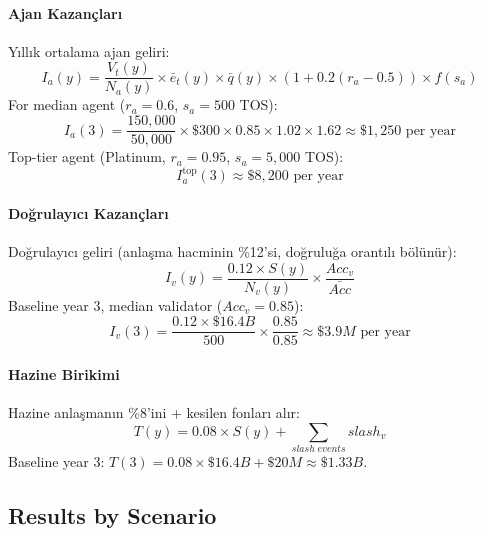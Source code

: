 \documentclass[11pt]{article}
\begin{document}
\begin{itemize}[noitemsep]
\begin{itemize}[noitemsep]
\begin{itemize}[noitemsep]
\begin{itemize}[noitemsep]
\begin{itemize}[noitemsep]
\begin{itemize}[noitemsep]
\begin{itemize}[noitemsep]
\begin{enumerate}[noitemsep]
\begin{itemize}[noitemsep]
\paragraph{Ajan Kazançları} Yıllık ortalama ajan geliri:
\begin{equation}
I_a(y) = \frac{V_t(y)}{N_a(y)} \times \bar{e}_t(y) \times \bar{q}(y) \times (1 + 0.2(r_a - 0.5)) \times f(s_a)
\end{equation}
For median agent ($r_a = 0.6$, $s_a = 500$ TOS):
\begin{equation}
I_a(3) = \frac{150{,}000}{50{,}000} \times \$300 \times 0.85 \times 1.02 \times 1.62 \approx \$1{,}250 \text{ per year}
\end{equation}
Top-tier agent (Platinum, $r_a = 0.95$, $s_a = 5{,}000$ TOS):
\begin{equation}
I_a^{\text{top}}(3) \approx \$8{,}200 \text{ per year}
\end{equation}

\paragraph{Doğrulayıcı Kazançları} Doğrulayıcı geliri (anlaşma hacminin \%12'si, doğruluğa orantılı bölünür):
\begin{equation}
I_v(y) = \frac{0.12 \times S(y)}{N_v(y)} \times \frac{Acc_v}{\bar{Acc}}
\end{equation}
Baseline year 3, median validator ($Acc_v = 0.85$):
\begin{equation}
I_v(3) = \frac{0.12 \times \$16.4B}{500} \times \frac{0.85}{0.85} \approx \$3.9M \text{ per year}
\end{equation}

\paragraph{Hazine Birikimi} Hazine anlaşmanın \%8'ini + kesilen fonları alır:
\begin{equation}
T(y) = 0.08 \times S(y) + \sum_{slash \; events} slash_v
\end{equation}
Baseline year 3: $T(3) = 0.08 \times \$16.4B + \$20M \approx \$1.33B$.

\subsection{Results by Scenario}

\end{itemize}
\end{enumerate}
\end{itemize}
\end{itemize}
\end{itemize}
\end{itemize}
\end{itemize}
\end{itemize}
\end{itemize}
\end{document}
